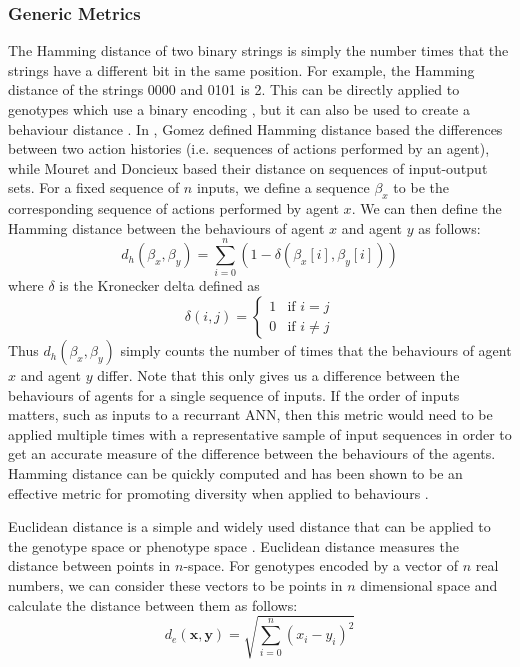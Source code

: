 \documentclass[12pt]{article} %
\begin{document}
\subsubsection{Generic Metrics}

The Hamming distance of two binary strings is simply the number times that the strings have a different bit in the same position. For example, the Hamming distance of the strings 0000 and 0101 is 2. This can be directly applied to genotypes which use a binary encoding \cite{Gomez2009}\cite{Sareni1998}, but it can also be used to create a behaviour distance \cite{Gomez2009}\cite{Mouret2012}. In \cite{Gomez2009}, Gomez defined Hamming distance based the differences between two action histories (i.e. sequences of actions performed by an agent), while Mouret and Doncieux \cite{Mouret2012} based their distance on sequences of input-output sets. For a fixed sequence of $n$ inputs, we define a sequence $\beta_x$ to be the corresponding sequence of actions performed by agent $x$. We can then define the Hamming distance between the behaviours of agent $x$ and agent $y$ as follows:
\[
d_h(\beta_x,\beta_y) = \displaystyle\sum\limits_{i=0}^n \left( 1 - \delta\left(\beta_x[i], \beta_y[i]\right)\right)
\]
where $\delta$ is the Kronecker delta defined as
\[
\delta(i,j) =
 \begin{cases}
1& \text{if } i=j\\
0& \text{if } i \neq j
\end{cases}
\]
Thus $d_h(\beta_x,\beta_y)$ simply counts the number of times that the behaviours of agent $x$ and agent $y$ differ. Note that this only gives us a difference between the behaviours of agents for a single sequence of inputs. If the order of inputs matters, such as inputs to a recurrant ANN, then this metric would need to be applied multiple times with a representative sample of input sequences in order to get an accurate measure of the difference between the behaviours of the agents. Hamming distance can be quickly computed and has been shown to be an effective metric for promoting diversity when applied to behaviours \cite{Gomez2009}\cite{Mouret2012}.

Euclidean distance is a simple and widely used distance that can be applied to the genotype space or phenotype space \cite{Gomez2009}\cite{Sareni1998}. Euclidean distance measures the distance between points in $n$-space. For genotypes encoded by a vector of $n$ real numbers, we can consider these vectors to be points in $n$ dimensional space and calculate the distance between them as follows:
\[
d_e(\mathbf{x},\mathbf{y})=\sqrt{\displaystyle\sum\limits_{i=0}^n (x_i - y_i)^2}
\]
\end{document}
